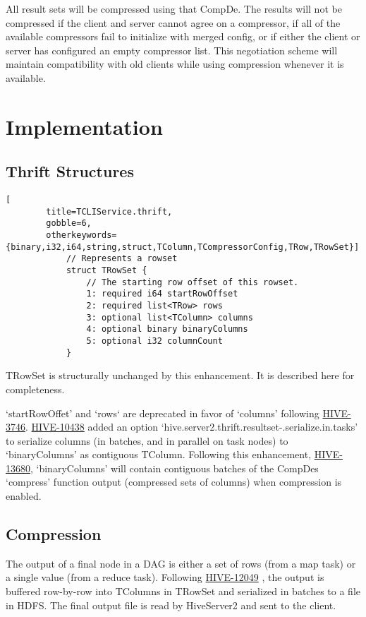 \documentclass[11pt,a4paper]{article}
\begin{document}
		All result sets will be compressed using that CompDe.
		The results will not be compressed if the client and server cannot agree on a compressor, if all of the available compressors fail to initialize with merged config, or if either the client or server has configured an empty compressor list.
		This negotiation scheme will maintain compatibility with old clients while using compression whenever it is available.
		
\section{Implementation}
	
	\subsection{Thrift Structures}
		
		\begin{lstlisting}[
		title=TCLIService.thrift,
		gobble=6,
		otherkeywords={binary,i32,i64,string,struct,TColumn,TCompressorConfig,TRow,TRowSet}]
			// Represents a rowset
			struct TRowSet {
				// The starting row offset of this rowset.
				1: required i64 startRowOffset
				2: required list<TRow> rows
				3: optional list<TColumn> columns
				4: optional binary binaryColumns
				5: optional i32 columnCount
			}
		\end{lstlisting}
		
		TRowSet is structurally unchanged by this enhancement. It is described here for completeness.
		
		`startRowOffet' and `rows` are deprecated in favor of `columns' following \href{https://issues.apache.org/jira/browse/HIVE-3746}{HIVE-3746}.
		\href{https://issues.apache.org/jira/browse/HIVE-10438}{HIVE-10438}
		added an option `hive.server2.thrift.resultset-.serialize.in.tasks' to serialize columns (in batches, and in parallel on task nodes) to `binaryColumns' as contiguous TColumn. Following this enhancement, 
		\href{https://issues.apache.org/jira/browse/HIVE-13680}{HIVE-13680},
		`binaryColumns' will contain contiguous batches of the CompDes `compress' function output (compressed sets of columns) when compression is enabled.
		
	\subsection{Compression}
	
		The output of a final node in a DAG is either a set of rows (from a map task) or a single value (from a reduce task).
		Following
		\href{https://issues.apache.org/jira/browse/HIVE-12049}{HIVE-12049}
		, the output is buffered row-by-row into TColumns in TRowSet and serialized in batches to a file in HDFS.
		The final output file is read by HiveServer2 and sent to the client.
		
\end{document}
